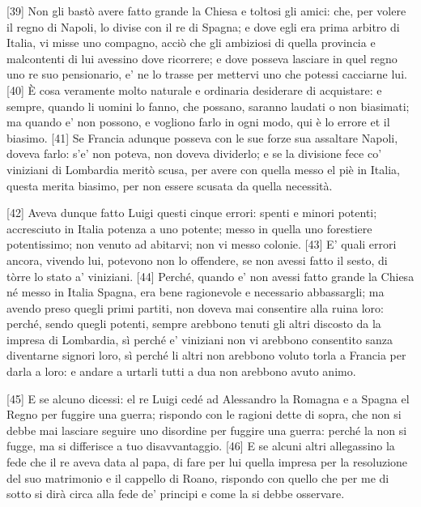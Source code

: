 {[}39{]} Non gli bastò avere fatto grande la Chiesa e toltosi gli amici:
che, per volere il regno di Napoli, lo divise con il re di Spagna; e
dove egli era prima arbitro di Italia, vi misse uno compagno, acciò che
gli ambiziosi di quella provincia e malcontenti di lui avessino dove
ricorrere; e dove posseva lasciare in quel regno uno re suo pensionario,
e' ne lo trasse per mettervi uno che potessi cacciarne lui. {[}40{]} È
cosa veramente molto naturale e ordinaria desiderare di acquistare: e
sempre, quando li uomini lo fanno, che possano, saranno laudati o non
biasimati; ma quando e' non possono, e vogliono farlo in ogni modo, qui
è lo errore et il biasimo. {[}41{]} Se Francia adunque posseva con le
sue forze sua assaltare Napoli, doveva farlo: s'e' non poteva, non
doveva dividerlo; e se la divisione fece co' viniziani di Lombardia
meritò scusa, per avere con quella messo el piè in Italia, questa merita
biasimo, per non essere scusata da quella necessità.

{[}42{]} Aveva dunque fatto Luigi questi cinque errori: spenti e minori
potenti; accresciuto in Italia potenza a uno potente; messo in quella
uno forestiere potentissimo; non venuto ad abitarvi; non vi messo
colonie. {[}43{]} E' quali errori ancora, vivendo lui, potevono non lo
offendere, se non avessi fatto il sesto, di tòrre lo stato a' viniziani.
{[}44{]} Perché, quando e' non avessi fatto grande la Chiesa né messo in
Italia Spagna, era bene ragionevole e necessario abbassargli; ma avendo
preso quegli primi partiti, non doveva mai consentire alla ruina loro:
perché, sendo quegli potenti, sempre arebbono tenuti gli altri discosto
da la impresa di Lombardia, sì perché e' viniziani non vi arebbono
consentito sanza diventarne signori loro, sì perché li altri non
arebbono voluto torla a Francia per darla a loro: e andare a urtarli
tutti a dua non arebbono avuto animo.

{[}45{]} E se alcuno dicessi: el re Luigi cedé ad Alessandro la Romagna
e a Spagna el Regno per fuggire una guerra; rispondo con le ragioni
dette di sopra, che non si debbe mai lasciare seguire uno disordine per
fuggire una guerra: perché la non si fugge, ma si differisce a tuo
disavvantaggio. {[}46{]} E se alcuni altri allegassino la fede che il re
aveva data al papa, di fare per lui quella impresa per la resoluzione
del suo matrimonio e il cappello di Roano, rispondo con quello che per
me di sotto si dirà circa alla fede de' principi e come la si debbe
osservare.


